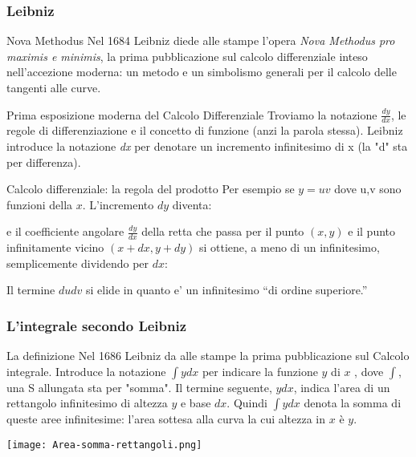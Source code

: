 \begin{frame}[label=Leibniz]
    \frametitle{Leibniz}
    \begin{block}{Nova Methodus}
    Nel 1684 Leibniz diede alle stampe l'opera \textit{Nova Methodus pro maximis e minimis}, 
    la prima pubblicazione sul \alert{calcolo differenziale}  
    inteso nell'accezione moderna: un metodo e un simbolismo generali
    per il calcolo delle tangenti alle curve.
    \end{block}
    \pause
    \begin{block}{Prima esposizione moderna del Calcolo Differenziale}
        Troviamo la notazione $\frac{dy}{dx}$, le regole di differenziazione e il concetto 
        di funzione (anzi la parola stessa). Leibniz introduce la notazione \textit{dx} 
        per denotare un incremento infinitesimo di x (la "d" sta per differenza).
    \end{block}
    \pause
    \begin{exampleblock}{Calcolo differenziale: la regola del prodotto}
        Per esempio se $y = uv$ dove u,v sono funzioni della $x$.
        L'incremento $dy$ diventa:
        \begin{center}
            \scalebox{1.5}{%
            $dy=(u+du)(v+dv)-uv = udv+vdu+ dudv$%
            }
        \end{center}
        e il coefficiente angolare $\frac{dy}{dx}$ della retta che passa 
        per il punto $(x,y)$ e il punto infinitamente vicino $(x+dx,y+dy)$
        si ottiene, a meno di un infinitesimo, semplicemente dividendo per $dx$:
        \begin{center}
        \end{center}
        Il termine $dudv$ si elide in quanto e' un infinitesimo ``di ordine superiore.''
    \end{exampleblock}
\end{frame}

\begin{frame}
    \frametitle{L'integrale secondo Leibniz}
    \begin{block}{La definizione}
        Nel 1686 Leibniz da alle stampe la prima pubblicazione 
        sul Calcolo integrale. Introduce la notazione $\int$$ydx$ per indicare
        la funzione $y$ di $x$ , dove $\int$, una S allungata sta per "somma".
        Il termine seguente, $ydx$, indica l'area di un rettangolo infinitesimo 
        di altezza $y$ e base $dx$. 
        Quindi $\int$$ydx$ denota la somma di queste aree infinitesime: 
        l'area sottesa alla curva la cui altezza in $x$ è $y$.  
    \end{block}
    \begin{center}
        \texttt{[image: Area-somma-rettangoli.png]}
    \end{center}
\end{frame}

